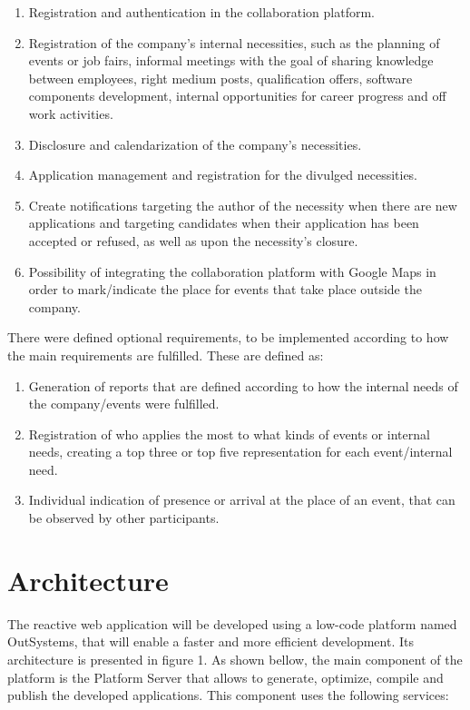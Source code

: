 \documentclass[a4paper,openright,12pt]{report}
\begin{document}
\begin{enumerate}
\item Registration and authentication in the collaboration platform.
\item Registration of the company's internal necessities, such as the planning of events or job fairs, informal meetings with the goal of sharing knowledge between employees, right medium posts, qualification offers, software components development, internal opportunities for career progress and off work activities.
\item Disclosure and calendarization of the company's necessities.
\item Application management and registration for the divulged necessities.
\item Create notifications targeting the author of the necessity when there are new applications and targeting candidates when their application has been accepted or refused, as well as upon the necessity's closure.
\item Possibility of integrating the collaboration platform with Google Maps in order to mark/indicate the place for events that take place outside the company.
\end{enumerate}

There were defined optional requirements, to be implemented according to how the main requirements are fulfilled. These are defined as:

\begin{enumerate}
\item Generation of reports that are defined according to how the internal needs of the company/events were fulfilled.
\item Registration of who applies the most to what kinds of events or internal needs, creating a top three or top five representation for each event/internal need. 
\item Individual indication of presence or arrival at the place of an event, that can be observed by other participants.
\end{enumerate}

\section*{Architecture}

The reactive web application will be developed using a low-code platform named OutSystems, that will enable a faster and more efficient development. Its architecture is presented in figure 1. As shown bellow, the main component of the platform is the Platform Server that allows to generate, optimize, compile and publish the developed applications. This component uses the following services:
\end{document}
